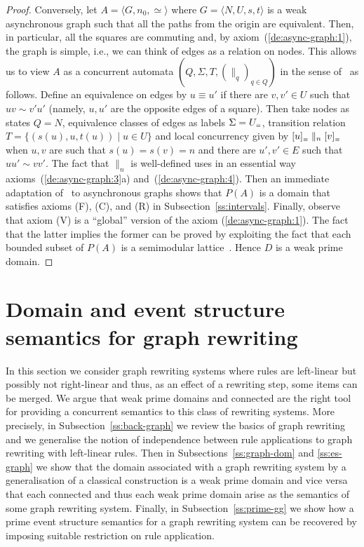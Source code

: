 \begin{proof}
  \bigskip
  
  Conversely, let $A = \langle G, n_0, \simeq \rangle$ where
  $G = \langle N, U, s, t \rangle$ is a weak asynchronous graph such that
  all the paths from the origin are equivalent. Then, in particular, all
  the squares are commuting and, by axiom~(\ref{de:async-graph:1}), the
  graph is simple, i.e., we can think of edges as a relation on
  nodes.
  This allows us to view $A$ as a concurrent automata
  $(Q,\Sigma, T, (\parallel_q)_{q \in Q})$ in the sense
  of~\cite{Dro:CAD} as follows. Define an equivalence on edges by
  $u \equiv u'$ if there are $v, v' \in U$ such that $u v \sim v'u'$
  (namely, $u, u'$ are the opposite edges of a square). Then take
  nodes as states $Q = N$, equivalence classes of edges as labels
  $\Sigma = \quotient{U}{\equiv}$, transition relation
  $T = \{ (s(u), u, t(u)) \mid u \in U \}$ and local concurrency given
  by $\eqclass[\equiv]{u} \parallel_n \eqclass[\equiv]{v}$ when $u, v$ are such that
  $s(u)=s(v)=n$ and there are $u', v' \in E$ such that $uu' \sim v v'$.
  The fact that $\parallel_n$ is well-defined uses in an essential way
  axioms~(\ref{de:async-graph:3}a) and~(\ref{de:async-graph:4}).  Then an immediate adaptation
  of~\cite[Theorem 10]{Dro:CAD} to asynchronous graphs shows that
  $P(A)$ is a domain that satisfies axioms (F), (C), and (R) in
  Subsection~\ref{ss:intervals}. Finally, observe that axiom (V) is a
  ``global'' version of the axiom (\ref{de:async-graph:1}). The fact
  that the latter implies the former can be proved by exploiting the
  fact that each bounded subset of $P(A)$ is a semimodular lattice~\cite[Theorem 3.1]{DK:ACRS}. 
  Hence $D$ is a weak prime domain.
\end{proof}



\section{Domain and event structure semantics for graph rewriting}
\label{se:graphs}

In this section we consider graph rewriting systems where rules are
left-linear but possibly not right-linear and thus, as an effect of a
rewriting step, some items can be merged. We argue that weak prime
domains and connected {\esabbr} are the right tool for providing a
concurrent semantics to this class of rewriting systems. More
precisely, in Subsection~\ref{ss:back-graph} we review the basics of
graph rewriting and we generalise the notion of independence between
rule applications to graph rewriting with left-linear rules.  Then in
Subsections~\ref{ss:graph-dom} and \ref{ss:es-graph} we show that the
domain associated with a graph rewriting system by a generalisation of
a classical construction is a weak prime domain and vice versa that
each connected {\esabbr} and thus each weak prime domain arise as the
semantics of some graph rewriting system. Finally, in
Subsection~\ref{ss:prime-gg} we show how a prime event structure
semantics for a graph rewriting system can be recovered by imposing
suitable restriction on rule application.

